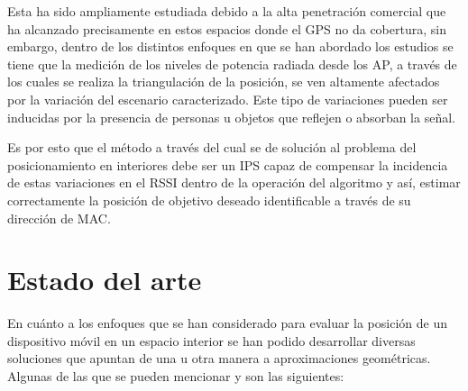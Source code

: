 Esta ha sido ampliamente estudiada debido a la alta penetración comercial que ha alcanzado precisamente en estos espacios donde el GPS no da cobertura, sin embargo, dentro de los distintos enfoques en que se han abordado los estudios se tiene que la medición de los niveles de potencia radiada desde los \ac{AP}, a través de los cuales se realiza la triangulación de la posición, se ven altamente afectados por la variación del escenario caracterizado. Este tipo de variaciones pueden ser inducidas por la presencia de personas u objetos que reflejen o absorban la señal.

Es por esto que el método a través del cual se de solución al problema del posicionamiento en interiores debe ser un \ac{IPS} capaz de compensar la incidencia de estas variaciones en el \ac{RSSI} dentro de la operación del algoritmo y así, estimar correctamente la posición de objetivo deseado identificable a través de su dirección de \ac{MAC}.

\section{Estado del arte}

En cuánto a los enfoques que se han considerado para evaluar la posición de un dispositivo móvil en un espacio interior se han podido desarrollar diversas soluciones que apuntan de una u otra manera a aproximaciones geométricas. Algunas de las que se pueden mencionar y son las siguientes:

